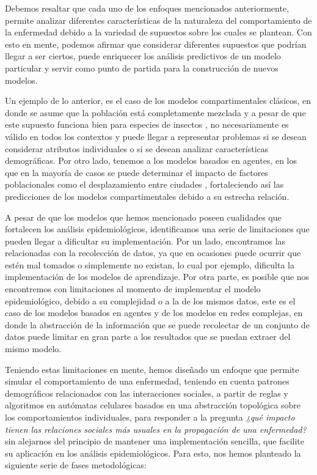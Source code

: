 Debemos resaltar que cada uno de los enfoques mencionados anteriormente, permite analizar diferentes características de la naturaleza del comportamiento de la enfermedad debido a la variedad de supuestos sobre los cuales se plantean. Con esto en mente, podemos afirmar que considerar diferentes supuestos que podrían llegar a ser ciertos, puede enriquecer los análisis predictivos de un modelo particular y servir como punto de partida para la construcción de nuevos modelos. 

Un ejemplo de lo anterior, es el caso de los modelos compartimentales clásicos, en donde se asume que la población está completamente mezclada y a pesar de que este supuesto funciona bien para especies de insectos \cite{malariaSIR}, no necesariamente es válido en todos los contextos y puede llegar a representar problemas si se desean considerar atributos individuales o si se desean analizar características demográficas. Por otro lado, tenemos a los modelos basados en agentes, en los que en la mayoría de casos se puede determinar el impacto de factores poblacionales como el desplazamiento entre ciudades \cite{populationDensity}, fortaleciendo así las predicciones de los modelos compartimentales debido a su estrecha relación.

A pesar de que los modelos que hemos mencionado poseen cualidades que fortalecen los análisis epidemiológicos, identificamos una serie de limitaciones que pueden llegar a dificultar su implementación. Por un lado, encontramos las relacionadas con la recolección de datos, ya que en ocasiones puede ocurrir que estén mal tomados o simplemente no existan, lo cual por ejemplo, dificulta la implementación de los modelos de aprendizaje. Por otra parte, es posible que nos encontremos con limitaciones al momento de implementar el modelo epidemiológico, debido a su complejidad o a la de los mismos datos, este es el caso de los modelos basados en agentes y de los modelos en redes complejas, en donde la abstracción de la información que se puede recolectar de un conjunto de datos puede limitar en gran parte a los resultados que se puedan extraer del mismo modelo.

Teniendo estas limitaciones en mente, hemos diseñado un enfoque que permite simular el comportamiento de una enfermedad, teniendo en cuenta patrones demográficos relacionados con las interacciones sociales, a partir de reglas y algoritmos en autómatas celulares basados en una abstracción topológica sobre los comportamientos individuales, para responder a la pregunta \textit{¿qué impacto tienen las relaciones sociales más usuales en la propagación de una enfermedad?} sin alejarnos del principio de mantener una implementación sencilla, que facilite su aplicación en los análisis epidemiológicos. Para esto, nos hemos planteado la siguiente serie de fases metodológicas:

